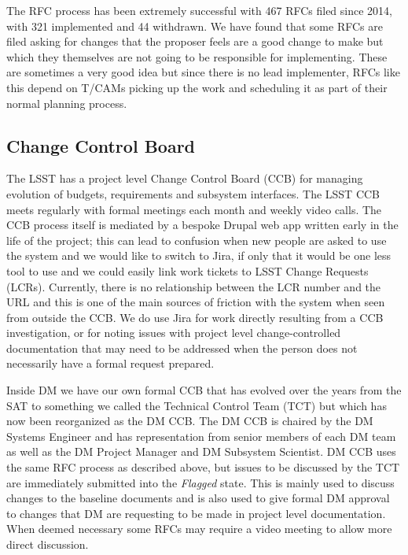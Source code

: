 The RFC process has been extremely successful with 467 RFCs filed since 2014, with 321 implemented and 44 withdrawn.
We have found that some RFCs are filed asking for changes that the proposer feels are a good change to make but which they themselves are not going to be responsible for implementing.
These are sometimes a very good idea but since there is no lead implementer, RFCs like this depend on T/CAMs picking up the work and scheduling it as part of their normal planning process.

\subsection{Change Control Board}

The LSST has a project level Change Control Board (CCB) for managing evolution of budgets, requirements and subsystem interfaces.
The LSST CCB meets regularly with formal meetings each month and weekly video calls.
The CCB process itself is mediated by a bespoke Drupal web app written early in the life of the project; this can lead to confusion when new people are asked to use the system and we would like to switch to Jira, if only that it would be one less tool to use and we could easily link work tickets to LSST Change Requests (LCRs).
Currently, there is no relationship between the LCR number and the URL and this is one of the main sources of friction with the system when seen from outside the CCB.
We do use Jira for work directly resulting from a CCB investigation, or for noting issues with project level change-controlled documentation that may need to be addressed when the person does not necessarily have a formal request prepared.

Inside DM we have our own formal CCB that has evolved over the years from the SAT to something we called the Technical Control Team (TCT) but which has now been reorganized as the DM CCB.
The DM CCB is chaired by the DM Systems Engineer and has representation from senior members of each DM team as well as the DM Project Manager and DM Subsystem Scientist.
DM CCB uses the same RFC process as described above, but issues to be discussed by the TCT are immediately submitted into the \emph{Flagged} state.
This is mainly used to discuss changes to the baseline documents and is also used to give formal DM approval to changes that DM are requesting to be made in project level documentation.
When deemed necessary some RFCs may require a video meeting to allow more direct discussion.
